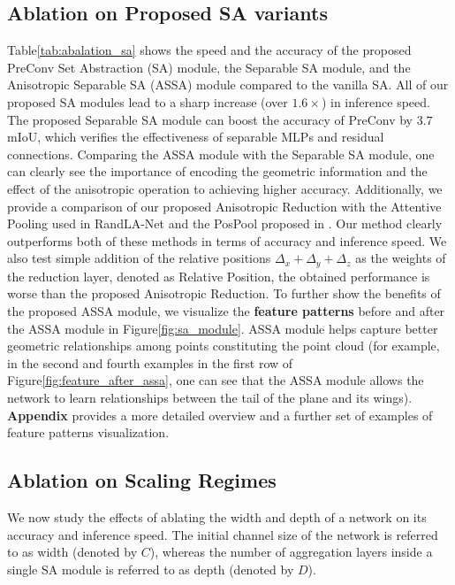 \documentclass{article}
\newcommand{\figLabel}{Figure\xspace}
\newcommand{\tblLabel}{Table\xspace}
\newcommand{\supp}{\textbf{Appendix}\xspace}
\begin{document}
\subsection{Ablation on Proposed SA variants}\label{sec:ablation_anisotropic} 
\tblLabel \ref{tab:abalation_sa} shows the speed and the accuracy of the proposed PreConv Set Abstraction (SA) module, the Separable SA module, and the Anisotropic Separable SA (ASSA) module compared to the vanilla SA. All of our proposed SA modules lead to a sharp increase (over $1.6\times$) in inference speed. The proposed Separable SA module can boost the accuracy of PreConv by $3.7$ mIoU, which verifies the effectiveness of separable MLPs and residual connections. Comparing the ASSA module with the Separable SA module, one can clearly see the importance of encoding the geometric information and the effect of the anisotropic operation to achieving higher accuracy. Additionally, we provide a comparison of our proposed Anisotropic Reduction with the Attentive Pooling used in RandLA-Net \cite{Hu2020RandLANetES} and the PosPool proposed in \cite{Liu2020ACL}. Our method clearly outperforms both of these methods in terms of accuracy and inference speed. We also test simple addition of the relative positions $\Delta_x + \Delta_y + \Delta_z $ as the weights of the reduction layer, denoted as Relative Position, the obtained performance is worse than the proposed Anisotropic Reduction.
To further show the benefits of the proposed ASSA module, we visualize the \textbf{feature patterns} before and after the ASSA module in \figLabel \ref{fig:sa_module}. ASSA module helps capture better geometric relationships among points constituting the point cloud (for example, in the second and fourth examples in the first row of \figLabel \ref{fig:feature_after_assa}, one can see that the ASSA module allows the network to learn relationships between the tail of the plane and its wings). \supp provides a more detailed overview and a further set of examples of feature patterns visualization. 

\subsection{Ablation on Scaling  Regimes}\label{sec:ablation_scaling}
We now study the effects of ablating the width and depth of a network on its accuracy and inference speed. The initial channel size of the network is referred to as width (denoted by $C$), whereas the number of aggregation layers inside a single SA module is referred to as depth (denoted by $D$). 
\end{document}
